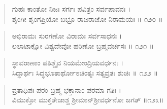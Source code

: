 \begin{verse}
ಗುಹಃ ಕಾಂತೋ ನಿಜಃ ಸರ್ಗಃ ಪವಿತ್ರಂ ಸರ್ವಪಾವನಃ ।\\ಶೃಂಗೀ ಶೃಂಗಪ್ರಿಯೋ ಬಭ್ರೂ ರಾಜರಾಜೋ ನಿರಾಮಯಃ \num{॥ ೧೨೦ ॥}
\end{verse}

\begin{verse}
ಅಭಿರಾಮಃ ಸುರಗಣೋ ವಿರಾಮಃ ಸರ್ವಸಾಧನಃ ।\\ಲಲಾಟಾಕ್ಷೋ ವಿಶ್ವದೇವೋ ಹರಿಣೋ ಬ್ರಹ್ಮವರ್ಚಸಃ \num{॥ ೧೨೧ ॥}
\end{verse}

\begin{verse}
ಸ್ಥಾವರಾಣಾಂ ಪತಿಶ್ಚೈವ ನಿಯಮೇಂದ್ರಿಯವರ್ಧನಃ ।\\ಸಿದ್ಧಾರ್ಥಃ ಸಿದ್ಧಭೂತಾರ್ಥೋಽಚಿಂತ್ಯಃ ಸತ್ಯವ್ರತಃ ಶುಚಿಃ \num{॥ ೧೨೨ ॥}
\end{verse}

\begin{verse}
ವ್ರತಾಧಿಪಃ ಪರಂ ಬ್ರಹ್ಮ ಭಕ್ತಾನಾಂ ಪರಮಾ ಗತಿಃ ।\\ವಿಮುಕ್ತೋ ಮುಕ್ತತೇಜಾಶ್ಚ ಶ್ರೀಮಾನ್​ಶ್ರೀವರ್ಧನೋ ಜಗತ್ \num{॥೧೨೩॥}
\end{verse}

